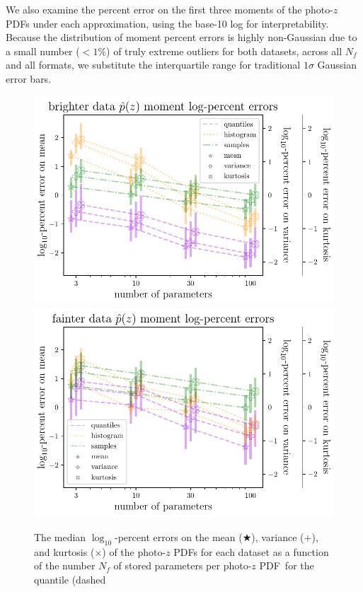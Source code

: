 \documentclass[\docopts]{\docclass}
\newcommand{\pz}{photo-$z$ PDF}
\begin{document}
We also examine the percent error on the first three moments of the \pz s under 
each approximation, using the base-10 log for interpretability.
Because the distribution of moment percent errors is highly non-Gaussian due to 
a small number ($<1\%$) of truly extreme outliers for both datasets, across all 
$N_{f}$ and all formats, we substitute the interquartile range for traditional 
$1\sigma$ Gaussian error bars.
\begin{figure}
  \begin{center}
    \includegraphics[width=\columnwidth]{graham_pz_err.pdf}
    \includegraphics[width=\columnwidth]{schmidt_pz_err.pdf}
    \caption{
   The median $\log_{10}$-percent errors on the mean ($\bigstar$), variance 
($+$), and kurtosis ($\times$) of the \pz s for each dataset as a function of 
the number $N_{f}$ of stored parameters per \pz\ for the quantile (dashed 
}
\end{center}
\end{figure}
\end{document}
